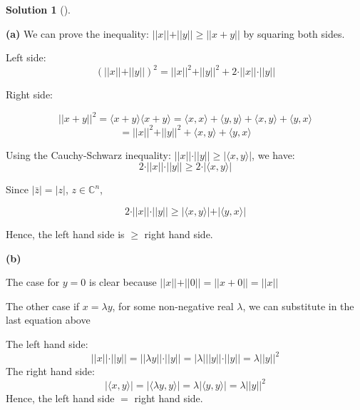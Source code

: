 \documentclass[numbers=enddot,12pt,final,onecolumn,notitlepage]{scrartcl}
\newcounter{sol}
\theoremstyle{definition}
\newtheorem{solu}[sol]{Solution}
\newenvironment{solution}[1][]
{\begin{solu}[#1]\begin{leftbar}}
        {\end{leftbar}\end{solu}}
\begin{document}
\begin{solution}
	\textbf{(a)} We can prove the inequality: $\vert\vert x \vert\vert + \vert\vert y \vert\vert \geq \vert\vert x + y \vert\vert$ by squaring both sides.

	Left side:
	\[
		(\vert\vert x \vert\vert + \vert\vert y \vert\vert)^2 = \vert\vert x \vert\vert ^2 + \vert\vert y \vert\vert ^2 + 2 \cdot  \vert\vert x \vert\vert \cdot \vert\vert y \vert\vert
	\]

	Right side:

	\[
		\vert\vert x + y \vert\vert ^ 2 = \langle x + y \rangle \langle x + y \rangle = \langle x, x \rangle + \langle y, y \rangle + \langle x, y \rangle + \langle y, x \rangle
	\]
	\[
		= \vert\vert x \vert\vert ^2 + \vert\vert y \vert\vert ^2 + \langle x, y \rangle + \langle y, x \rangle
	\]

	Using the Cauchy-Schwarz inequality: $\vert\vert x \vert\vert \cdot \vert\vert y \vert\vert \geq \vert \langle x,y \rangle \vert$, we have:
	\[
		2 \cdot  \vert\vert x \vert\vert \cdot \vert\vert y \vert\vert \geq 2 \cdot \vert \langle x,y \rangle \vert
	\]

	Since $\vert \bar{z} \vert = \vert z \vert$, $z \in \mathbb{C}^{n}$,

	\[
		2 \cdot  \vert\vert x \vert\vert \cdot \vert\vert y \vert\vert \geq \vert \langle x,y \rangle \vert + \vert \langle y,x \rangle \vert
	\]

	Hence, the left hand side is $\geq$ right hand side.

	\textbf{(b)}

	The case for $y = 0$ is clear because $\vert\vert x \vert\vert + \vert\vert 0 \vert\vert = \vert\vert x + 0 \vert\vert = \vert\vert x \vert\vert$

	The other case if $x = \lambda y$, for some non-negative real $\lambda$, we can substitute in the last equation above

	The left hand side:
	\[
		\vert\vert x \vert\vert \cdot \vert\vert y \vert\vert = \vert\vert \lambda y \vert\vert \cdot \vert\vert y \vert\vert = \vert \lambda \vert \vert\vert y \vert\vert \cdot \vert\vert y \vert\vert = \lambda \vert\vert y \vert\vert ^2
	\]
	The right hand side:
	\[
		\vert \langle x,y \rangle \vert = \vert \langle \lambda y,y \rangle \vert = \lambda \vert \langle y,y \rangle \vert = \lambda \vert\vert y \vert\vert ^ 2
	\]
	Hence, the left hand side $=$ right hand side.

\end{solution}
\end{document}
